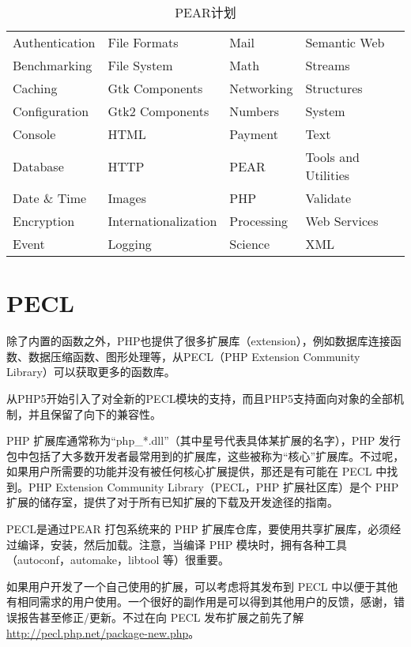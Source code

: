 \begin{table}[!ht]
\centering
\caption{PEAR计划}
\label{php_pear}
\begin{tabular}{llll}
Authentication	&File Formats		&Mail			&Semantic Web\\
Benchmarking	&File System		&Math			&Streams\\
Caching			&Gtk Components	&Networking	&Structures\\
Configuration	&Gtk2 Components	&Numbers		&System\\
Console			&HTML				&Payment		&Text\\
Database		&HTTP				&PEAR			&Tools and Utilities\\
Date \& Time	&Images			&PHP			&Validate\\
Encryption		&Internationalization&Processing	&Web Services\\
Event			&Logging			&Science		&XML\\
\end{tabular}
\end{table}



\section{PECL}



除了内置的函数之外，PHP也提供了很多扩展库（extension），例如数据库连接函数、数据压缩函数、图形处理等，从PECL（PHP Extension Community Library）可以获取更多的函数库。




从PHP5开始引入了对全新的PECL模块的支持，而且PHP5支持面向对象的全部机制，并且保留了向下的兼容性。




PHP 扩展库通常称为“php\_*.dll”（其中星号代表具体某扩展的名字），PHP 发行包中包括了大多数开发者最常用到的扩展库，这些被称为“核心”扩展库。不过呢，如果用户所需要的功能并没有被任何核心扩展提供，那还是有可能在 PECL 中找到。PHP Extension Community Library（PECL，PHP 扩展社区库）是个 PHP 扩展的储存室，提供了对于所有已知扩展的下载及开发途径的指南。

PECL是通过PEAR 打包系统来的 PHP 扩展库仓库，要使用共享扩展库，必须经过编译，安装，然后加载。注意，当编译 PHP 模块时，拥有各种工具（autoconf，automake，libtool 等）很重要。

如果用户开发了一个自己使用的扩展，可以考虑将其发布到 PECL 中以便于其他有相同需求的用户使用。一个很好的副作用是可以得到其他用户的反馈，感谢，错误报告甚至修正/更新。不过在向 PECL 发布扩展之前先了解\url{http://pecl.php.net/package-new.php}。



